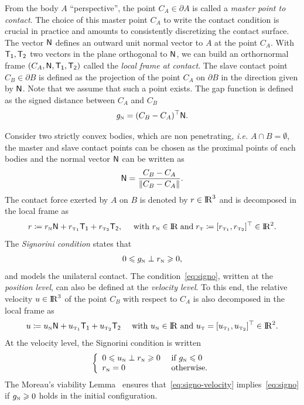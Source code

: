 {From the body $A$ ``perspective'', the point $C_{A} \in \partial A$ is called a \emph{master point to contact}.  The choice of this master point $C_A$ to write the contact condition is crucial in  practice and amounts to consistently discretizing  the contact surface. The vector  ${\sf N}$ defines an outward unit normal vector to $A$ at the point $C_A$. With $\sf T_1, T_2$ two vectors in the plane orthogonal to ${\sf N}$, we can build  an orthornormal frame $(C_A, \sf N, T_1, T_2)$ called the \emph{local frame at contact}. The slave contact point $C_B \in \partial B$ is defined as the projection of the point $C_A$ on $\partial B$ in the direction given by $\sf N$. Note that we assume that such a point exists. The gap function is defined as the signed distance between $C_A$ and $C_B$
\begin{equation}
  \label{eq:gap}
  g_{\n} = (C_B-C_A)^\top  \sf N.
\end{equation}


Consider two strictly convex bodies, which are non penetrating, {\it i.e.}  $A \cap B = \emptyset$, the master and slave contact points can be chosen as the proximal points of each bodies and the normal vector  ${\sf N}$ can be written as
\begin{equation}
  \label{eq:normal}
  {\sf N} = \Frac{C_B-C_A}{\|C_B-C_A\|}.
\end{equation}
%
The contact force exerted by $A$ on $B$ is denoted by $r \in \mathrm{I\!R}^3$ and is decomposed in the local frame as
\begin{equation}
  \label{eq:reaction}
  r \coloneqq r_{\n} {\sf N} +   r_{\tone}{\sf T_1} + r_{\ttwo}{\sf T_2}  ,\quad \text{ with  } r_{\n} \in \RR\;\text{and}\; r_{\t}\coloneqq[r_{\tone},r_{\ttwo}]^\top \in \RR^2.
\end{equation}
%
The \emph{Signorini condition} states that
\begin{equation}
  \label{eq:signo}
  0 \leq g_{\n} \perp r_\n \geq 0,
\end{equation}
and models the unilateral contact. The condition~\eqref{eq:signo}, written at the \emph{position level}, can also be defined at the \emph{velocity level}.
To this end, the relative velocity $u \in \mathrm{I\!R}^3$ of the point $C_{B}$ with respect to $C_{A}$ is also decomposed in the local frame  as
\begin{equation}
  u \coloneqq  u_{\hbox{\tiny{N}}} {\sf N} +  u_{{\hbox{\tiny{T}}}_{\hbox{\tiny{1}}}}{\sf T_1} + u_{{\hbox{\tiny{T}}}_{\hbox{\tiny{2}}}}{\sf T_2}  \quad \text{ with } u_{\hbox{\tiny{N}}} \in \mathrm{I\!R} \text{ and } u_{\hbox{\tiny{T}}}=[u_{{\hbox{\tiny{T}}}_{\hbox{\tiny{1}}}},u_{{\hbox{\tiny{T}}}_{\hbox{\tiny{2}}}}]^\top  \in \mathrm{I\!R}^2.
\end{equation}
%
At the velocity level, the Signorini condition is written 
\begin{equation}
  \label{eq:signo-velocity}
  \left\{\begin{array}{ll}
  0 \leq u_{\n} \perp r_\n \geq 0  &\text{ if } g_{\n} \leq 0 \\
  r_{\n} =0 &\text{ otherwise}.
\end{array}\right.
\end{equation}
The Moreau's viability Lemma~\cite{Moreau1988} ensures that~\eqref{eq:signo-velocity} implies~\eqref{eq:signo} if $g_{{\hbox{\tiny{N}}}}\geqslant 0$ holds in the initial configuration.

}
